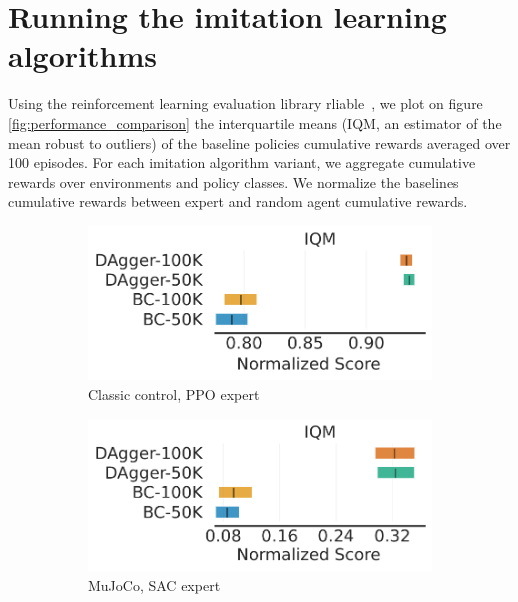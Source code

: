 \section{Running the imitation learning algorithms}
Using the reinforcement learning evaluation library rliable~\cite{rliable}, we plot on figure \ref{fig:performance_comparison} the interquartile means (IQM, an estimator of the mean robust to outliers) of the baseline policies cumulative rewards averaged over 100 episodes.
For each imitation algorithm variant, we aggregate cumulative rewards over environments and policy classes.
We normalize the baselines cumulative rewards between expert and random agent cumulative rewards.

\begin{figure}[ht]
\centering
\begin{subfigure}{.33\textwidth}
  \centering
  \includegraphics[width=\linewidth]{images/images_part3/ppo_expert_classic_control.pdf}
  \caption{Classic control, PPO expert}
  \label{fig:ppo_classic}
\end{subfigure}%
\begin{subfigure}{.33\textwidth}
  \centering
  \includegraphics[width=\linewidth]{images/images_part3/sac_expert_mujoco.pdf}
  \caption{MuJoCo, SAC expert}
  \label{fig:sac_mujoco}
\end{subfigure}
\begin{subfigure}{.33\textwidth}

\end{subfigure}
\end{figure}
